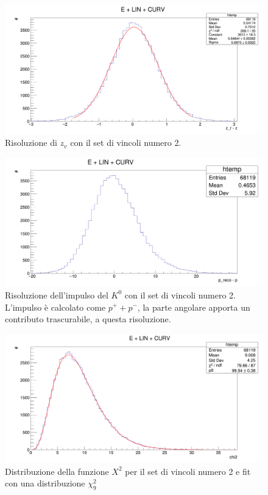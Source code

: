 \documentclass[8pt]{extarticle}
\begin{document}
\begin{figure}[h!]
	\begin{center}
		\includegraphics[scale=0.25]{set_2_z} 
		\caption{Risoluzione di $z_v$ con il set di vincoli numero 2.}
		\label{fig:set_2_z}
	\end{center}
\end{figure}

\begin{figure}[h!]
	\begin{center}
		\includegraphics[scale=0.25]{set_2_p} 
		\caption{Risoluzione dell'impulso del $K^0$ con il set di vincoli numero 2. L'impulso è calcolato come $p^+ + p^-$, la parte angolare apporta un contributo trascurabile, a questa risoluzione.}
		\label{fig:set_2_p}
	\end{center}
\end{figure}

\begin{figure}[h!]
	\begin{center}
		\includegraphics[scale=0.25]{set_2_chi2} 
		\caption{Distribuzione della funzione $X^2$ per il set di vincoli numero 2 e fit con una distribuzione $\chi^2_9$}
		\label{fig:set_2_chi2}
	\end{center}
\end{figure}
\end{document}
